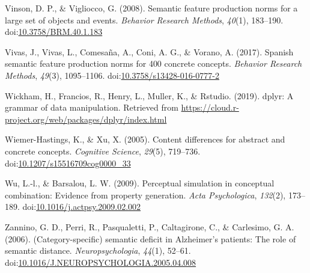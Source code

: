 \documentclass[man]{apa6}
\begin{document}
\leavevmode\hypertarget{ref-Vinson2008}{}%
Vinson, D. P., \& Vigliocco, G. (2008). Semantic feature production norms for a large set of objects and events. \emph{Behavior Research Methods}, \emph{40}(1), 183--190. doi:\href{https://doi.org/10.3758/BRM.40.1.183}{10.3758/BRM.40.1.183}

\leavevmode\hypertarget{ref-Vivas2017}{}%
Vivas, J., Vivas, L., Comesaña, A., Coni, A. G., \& Vorano, A. (2017). Spanish semantic feature production norms for 400 concrete concepts. \emph{Behavior Research Methods}, \emph{49}(3), 1095--1106. doi:\href{https://doi.org/10.3758/s13428-016-0777-2}{10.3758/s13428-016-0777-2}

\leavevmode\hypertarget{ref-Wickham2019}{}%
Wickham, H., Francios, R., Henry, L., Muller, K., \& Rstudio. (2019). dplyr: A grammar of data manipulation. Retrieved from \url{https://cloud.r-project.org/web/packages/dplyr/index.html}

\leavevmode\hypertarget{ref-KatjaWiemer-Hastings2005}{}%
Wiemer-Hastings, K., \& Xu, X. (2005). Content differences for abstract and concrete concepts. \emph{Cognitive Science}, \emph{29}(5), 719--736. doi:\href{https://doi.org/10.1207/s15516709cog0000_33}{10.1207/s15516709cog0000\_33}

\leavevmode\hypertarget{ref-Wu2009}{}%
Wu, L.-l., \& Barsalou, L. W. (2009). Perceptual simulation in conceptual combination: Evidence from property generation. \emph{Acta Psychologica}, \emph{132}(2), 173--189. doi:\href{https://doi.org/10.1016/j.actpsy.2009.02.002}{10.1016/j.actpsy.2009.02.002}

\leavevmode\hypertarget{ref-Zannino2006}{}%
Zannino, G. D., Perri, R., Pasqualetti, P., Caltagirone, C., \& Carlesimo, G. A. (2006). (Category-specific) semantic deficit in Alzheimer's patients: The role of semantic distance. \emph{Neuropsychologia}, \emph{44}(1), 52--61. doi:\href{https://doi.org/10.1016/J.NEUROPSYCHOLOGIA.2005.04.008}{10.1016/J.NEUROPSYCHOLOGIA.2005.04.008}

\endgroup
\end{document}
